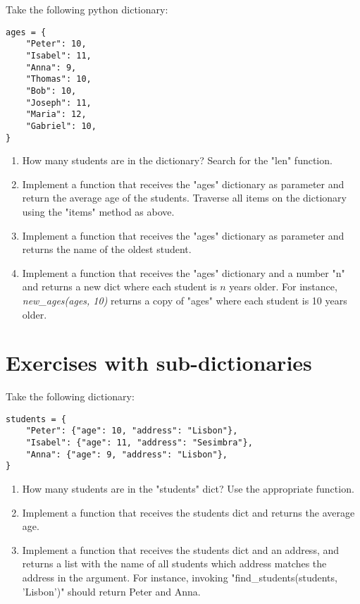 Take the following python dictionary:

\begin{verbatim}
ages = {
    "Peter": 10,
    "Isabel": 11,
    "Anna": 9,
    "Thomas": 10,
    "Bob": 10,
    "Joseph": 11,
    "Maria": 12,
    "Gabriel": 10,
}
\end{verbatim}

\begin{enumerate}

\item How many students are in the dictionary? Search for the "len" function.

\item Implement a function that receives the "ages" dictionary as parameter and return the average age of the students. Traverse all items on the dictionary using the "items" method as above.

\item Implement a function that receives the "ages" dictionary as parameter and returns the name of the oldest student.

\item Implement a function that receives the "ages" dictionary and a number "n" and returns a new dict where each student is $n$ years older. For instance, \textit{new\_ages(ages, 10)} returns a copy of "ages" where each student is 10 years older.

\end{enumerate}

\section{Exercises with sub-dictionaries}

Take the following dictionary:

\begin{verbatim}
students = {
    "Peter": {"age": 10, "address": "Lisbon"},
    "Isabel": {"age": 11, "address": "Sesimbra"},
    "Anna": {"age": 9, "address": "Lisbon"},
}
\end{verbatim}

\begin{enumerate}

\item How many students are in the "students" dict? Use the appropriate function.

\item Implement a function that receives the students dict and returns the average age.

\item Implement a function that receives the students dict and an address, and returns a list with the name of all students which address matches the address in the argument. For instance, invoking "find\_students(students, 'Lisbon')" should return Peter and Anna. 

\end{enumerate}